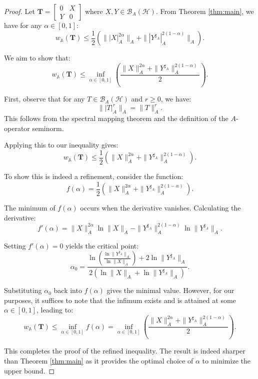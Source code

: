 \documentclass{article}
\begin{document}
\begin{proof}
  Let $\mathbf{T} = \begin{bmatrix} 0 & X \\ Y & 0 \end{bmatrix}$ where $X,Y \in \mathcal{B}_A(\mathcal{H})$. From Theorem \ref{thm:main}, we have for any $\alpha \in [0,1]$:
\[
w_{\mathbb{A}}(\mathbf{T}) \leq \frac{1}{2}\left(\||X|_A^{2\alpha}\|_A + \||Y^{\sharp_A}|_A^{2(1-\alpha)}\|_A\right).
\]

We aim to show that:
\[
w_{\mathbb{A}}(\mathbf{T}) \leq \inf_{\alpha \in [0,1]} \left(\frac{\|X\|_A^{2\alpha} + \|Y^{\sharp_A}\|_A^{2(1-\alpha)}}{2}\right).
\]

First, observe that for any $T \in \mathcal{B}_A(\mathcal{H})$ and $r \geq 0$, we have:
\[
\||T|_A^r\|_A = \|T\|_A^r.
\]
This follows from the spectral mapping theorem and the definition of the $A$-operator seminorm.

Applying this to our inequality gives:
\[
w_{\mathbb{A}}(\mathbf{T}) \leq \frac{1}{2}\left(\|X\|_A^{2\alpha} + \|Y^{\sharp_A}\|_A^{2(1-\alpha)}\right).
\]

To show this is indeed a refinement, consider the function:
\[
f(\alpha) = \frac{1}{2}\left(\|X\|_A^{2\alpha} + \|Y^{\sharp_A}\|_A^{2(1-\alpha)}\right).
\]

The minimum of $f(\alpha)$ occurs when the derivative vanishes. Calculating the derivative:
\[
f'(\alpha) = \|X\|_A^{2\alpha}\ln\|X\|_A - \|Y^{\sharp_A}\|_A^{2(1-\alpha)}\ln\|Y^{\sharp_A}\|_A.
\]

Setting $f'(\alpha) = 0$ yields the critical point:
\[
\alpha_0 = \frac{\ln\left(\frac{\ln\|Y^{\sharp_A}\|_A}{\ln\|X\|_A}\right) + 2\ln\|Y^{\sharp_A}\|_A}{2(\ln\|X\|_A + \ln\|Y^{\sharp_A}\|_A)}.
\]

Substituting $\alpha_0$ back into $f(\alpha)$ gives the minimal value. However, for our purposes, it suffices to note that the infimum exists and is attained at some $\alpha \in [0,1]$, leading to:
\[
w_{\mathbb{A}}(\mathbf{T}) \leq \inf_{\alpha \in [0,1]} f(\alpha) = \inf_{\alpha \in [0,1]} \left(\frac{\|X\|_A^{2\alpha} + \|Y^{\sharp_A}\|_A^{2(1-\alpha)}}{2}\right).
\]

This completes the proof of the refined inequality. The result is indeed sharper than Theorem \ref{thm:main} as it provides the optimal choice of $\alpha$ to minimize the upper bound.

\end{proof}
\end{document}
